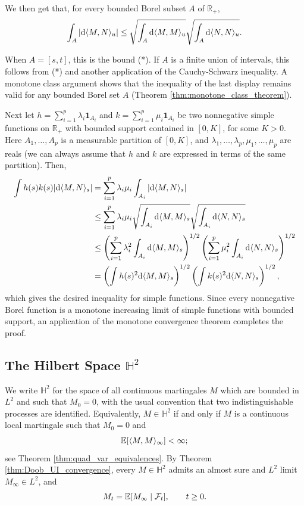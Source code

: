 \documentclass[../Main.tex]{subfiles}
\begin{document}
{We then get that, for every bounded Borel subset $A$ of $\mathbb{R}_+$,
\begin{align*}
\int_A |{\rm d}\langle M, N \rangle_u| \leq \sqrt{\int_A {\rm d}\langle M, M \rangle_u} \sqrt{\int_A {\rm d}\langle N, N \rangle_u}.
\end{align*}

When $A = [s, t]$, this is the bound (*). If $A$ is a finite union of intervals, this follows from (*) and another application of the Cauchy-Schwarz inequality. A monotone class argument shows that the inequality of the last display remains valid for any bounded Borel set $A$ (Theorem \ref{thm:monotone_class_theorem}).

Next let $h = \sum_{i=1}^p \lambda_i \mathbf{1}_{A_i}$ and $k = \sum_{i=1}^p \mu_i \mathbf{1}_{A_i}$ be two nonnegative simple functions on $\mathbb{R}_+$ with bounded support contained in $[0, K]$, for some $K > 0$. Here $A_1, \dots, A_p$ is a measurable partition of $[0, K]$, and $\lambda_1, \dots, \lambda_p, \mu_1, \dots, \mu_p$ are reals (we can always assume that $h$ and $k$ are expressed in terms of the same partition). Then,
\begin{align*}
\int h(s)k(s)|{\rm d}\langle M, N \rangle_s| &= \sum_{i=1}^p \lambda_i \mu_i \int_{A_i} |{\rm d}\langle M, N \rangle_s| \\
&\leq \sum_{i=1}^p \lambda_i \mu_i \sqrt{\int_{A_i} {\rm d}\langle M, M \rangle_s} \sqrt{\int_{A_i} {\rm d}\langle N, N \rangle_s} \\
&\leq \left( \sum_{i=1}^p \lambda_i^2 \int_{A_i} {\rm d}\langle M, M \rangle_s \right)^{1/2} \left( \sum_{i=1}^p \mu_i^2 \int_{A_i} {\rm d}\langle N, N \rangle_s \right)^{1/2} \\
&= \left( \int h(s)^2 {\rm d}\langle M, M \rangle_s \right)^{1/2} \left( \int k(s)^2 {\rm d}\langle N, N \rangle_s \right)^{1/2},
\end{align*}
which gives the desired inequality for simple functions. Since every nonnegative Borel function is a monotone increasing limit of simple functions with bounded support, an application of the monotone convergence theorem completes the proof. 
}


\subsection{The Hilbert Space \texorpdfstring{$\mathbb{H}^2$}{H2}}

We write $\mathbb{H}^2$ for the space of all continuous martingales $M$ which
are bounded in $L^2$ and such that $M_0=0$, with the usual convention that two
indistinguishable processes are identified. Equivalently, $M\in\mathbb{H}^2$
if and only if $M$ is a continuous local martingale such that $M_0=0$ and
\[
\mathbb{E}[\langle M,M\rangle_\infty]<\infty;
\]
see Theorem \ref{thm:quad_var_equivalences}. By Theorem
\ref{thm:Doob_UI_convergence}, every $M\in\mathbb{H}^2$ admits an almost sure
and $L^2$ limit $M_\infty\in L^2$, and
\[
M_t=\mathbb{E}[M_\infty\mid\mathcal{F}_t],\qquad t\geq 0.
\]
\end{document}
